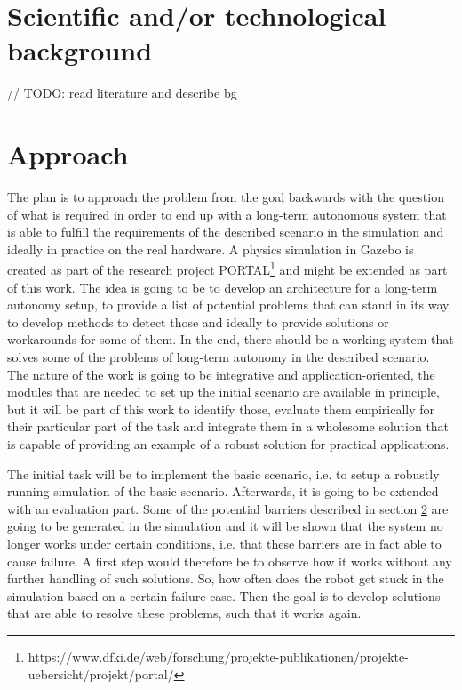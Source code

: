 \documentclass[german, master, expose, latin1]{base/thesis_KBS}
\begin{document}
\section{Scientific and/or technological background}

// TODO: read literature and describe bg

\section{Approach}

The plan is to approach the problem from the goal backwards with the question of what is required in order to end up with a long-term autonomous system that is
able to fulfill the requirements of the described scenario in the simulation and ideally in practice on the real hardware.
A physics simulation in Gazebo is created as part of the research project PORTAL\footnote{https://www.dfki.de/web/forschung/projekte-publikationen/projekte-uebersicht/projekt/portal/}
and might be extended as part of this work. The idea is going to be to develop an architecture for a long-term autonomy setup, to provide a list of potential problems
that can stand in its way, to develop methods to detect those and ideally to provide solutions or workarounds for some of them.
In the end, there should be a working system that solves some of the problems of long-term autonomy in the described scenario.
The nature of the work is going to be integrative and application-oriented, the modules that are needed to set up the initial scenario are available in principle, 
but it will be part of this work to identify those, evaluate them empirically for their particular part of the task and integrate them in a wholesome solution
that is capable of providing an example of a robust solution for practical applications.

The initial task will be to implement the basic scenario, i.e. to setup a robustly running simulation of the basic scenario.
Afterwards, it is going to be extended with an evaluation part. Some of the potential barriers described in section \ref{} are going to be generated
in the simulation and it will be shown that the system no longer works under certain conditions, i.e. that these barriers are in fact able to cause failure.
A first step would therefore be to observe how it works without any further handling of such solutions. So, how often does the robot get stuck in the simulation 
based on a certain failure case. Then the goal is to develop solutions that are able to resolve these problems, such that it works again.
\end{document}
